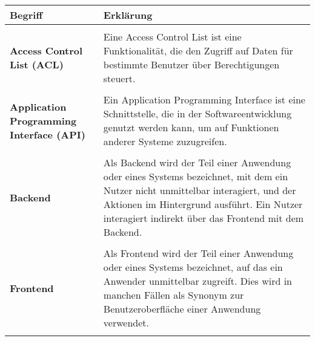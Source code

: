 \chapter{}

\begin{longtable}{p{5cm}p{10cm}}
    \textbf{Begriff} & \textbf{Erklärung} \\
    \hline
    \\
    \textbf{Access Control List (ACL)} & Eine Access Control List ist eine Funktionalität, die den Zugriff auf Daten für bestimmte Benutzer über Berechtigungen steuert. \\\\
    \textbf{Application Programming Interface (API)} & Ein Application Programming Interface ist eine Schnittstelle, die in der Softwareentwicklung genutzt werden kann, um auf Funktionen anderer Systeme zuzugreifen. \\\\
    \textbf{Backend} & Als Backend wird der Teil einer Anwendung oder eines Systems bezeichnet, mit dem ein Nutzer nicht unmittelbar interagiert, und der Aktionen im Hintergrund ausführt. Ein Nutzer interagiert indirekt über das Frontend mit dem Backend. \\\\
    \textbf{Frontend} & Als Frontend wird der Teil einer Anwendung oder eines Systems bezeichnet, auf das ein Anwender unmittelbar zugreift. Dies wird in manchen Fällen als Synonym zur Benutzeroberfläche einer Anwendung verwendet. \\\\
\end{longtable}
